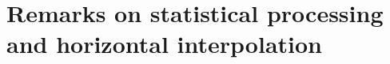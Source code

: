 \documentclass[a4paper,twoside,10pt]{book}
\newcommand*\cleartoleftpage{%
  \clearpage
  \ifodd\value{page}\hbox{}\newpage\fi
}
\begin{document}



\chapter[Remarks on statistical processing and horizontal interpolation]{Remarks on statistical processing and horizontal interpolation}







\begin{appendices}
\end{appendices}

\backmatter

\renewcommand{\chaptermark}[1] {
  \markboth{#1}{}
}

\renewcommand{\chaptermark}[1]{%
  \markboth{\chaptername
    \ \thechapter.\ #1}{}}


\newpage
\cleartoleftpage



\end{document}
